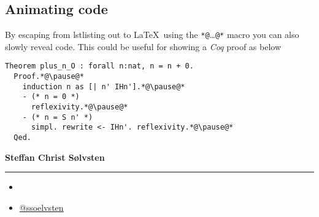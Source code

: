 \documentclass[english, aspectratio=169]{beamer}
\begin{document}
\begin{frame}
\begin{columns}
\begin{column}{0.5\linewidth}
    \end{column}
  \end{columns}
\end{frame}

\subsection{Animating code}
\begin{frame}[fragile]
  By escaping from lstlisting out to \LaTeX\ using the
  \texttt{*@}\dots\texttt{@*} macro you can also slowly reveal code. This could
  be useful for showing a \emph{Coq} proof as below
  \begin{lstlisting}[language=coq]
  Theorem plus_n_O : forall n:nat, n = n + 0.
  Proof.*@\pause@*
    induction n as [| n' IHn'].*@\pause@*
    - (* n = 0 *)
      reflexivity.*@\pause@*
    - (* n = S n' *)
      simpl. rewrite <- IHn'. reflexivity.*@\pause@*
  Qed.
  \end{lstlisting}
\end{frame}

\begin{frame}{}

  {\Large \textbf{Steffan Christ Sølvsten}}
  {\hrule width0.5\linewidth}

  \vspace{5pt}

  \begin{itemize}
  \item[\faIcon{envelope}] 
  \item[\faIcon{twitter}] \href{https://www.twitter.com/ssoelvsten}{@ssoelvsten}
  \end{itemize}
\end{frame}
\end{document}
